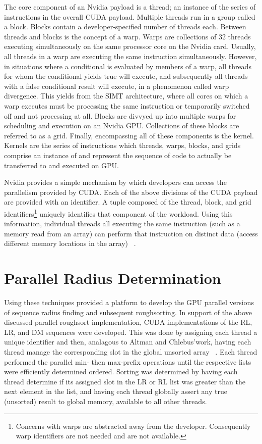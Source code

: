 \documentclass[letterpaper, 12pt]{article}
\let\supercite\cite
\renewcommand{\cite}[1]{\textnormal{~\supercite{#1}}}
\begin{document}
  The core component of an Nvidia payload is a thread; an instance of the series of instructions in the overall CUDA payload.  Multiple threads run in a group called a block.  Blocks contain a developer-specified number of threads each.  Between threads and blocks is the concept of a warp.  Warps are collections of 32 threads executing simultaneously on the same processor core on the Nvidia card.  Usually, all threads in a warp are executing the same instruction simultaneously. However, in situations where a conditional is evaluated by members of a warp, all threads for whom the conditional yields true will execute, and subsequently all threads with a false conditional result will execute, in a phenomenon called warp divergence.  This yields from the SIMT architecture, where all cores on which a warp executes must be processing the same instruction or temporarily switched off and not processing at all.  Blocks are divvyed up into multiple warps for scheduling and execution on an Nvidia GPU.  Collections of these blocks are referred to as a grid.  Finally, encompassing all of these components is the kernel.  Kernels are the series of instructions which threads, warps, blocks, and grids comprise an instance of and represent the sequence of code to actually be transferred to and executed on GPU.

  Nvidia provides a simple mechanism by which developers can access the parallelism provided by CUDA.  Each of the above divisions of the CUDA payload are provided with an identifier.  A tuple composed of the thread, block, and grid identifiers\footnote{Concerns with warps are abstracted away from the developer.  Consequently warp identifiers are not needed and are not available.} uniquely identifies that component of the workload.  Using this information, individual threads all executing the same instruction (such as a memory read from an array) can perform that instruction on distinct data (access different memory locations in the array) \cite{cuda}.

\section{Parallel Radius Determination}

  Using these techniques provided a platform to develop the GPU parallel versions of sequence radius finding and subsequent roughsorting.  In support of the above discussed parallel roughsort implementation, CUDA implementations of the RL, LR, and DM sequences were developed.  This was done by assigning each thread a unique identifier and then, analagous to Altman and Chlebus\textquoteright work, having each thread manage the corresponding slot in the global unsorted array \cite{altman89}.  Each thread performed the parallel min- then max-prefix operations until the respective lists were efficiently determined ordered.  Sorting was determined by having each thread determine if its assigned slot in the LR or RL list was greater than the next element in the list, and having each thread globally assert any true (unsorted) result to global memory, available to all other threads.
\end{document}
